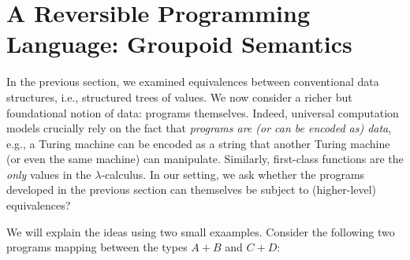 \section{A Reversible Programming Language: Groupoid Semantics}
\label{sec:reversibletwo}
\label{langeqeq}

In the previous section, we examined equivalences between conventional data structures, i.e., structured trees of
values. We now consider a richer but foundational notion of data: programs themselves. Indeed, universal computation
models crucially rely on the fact that \emph{programs are (or can be encoded as) data}, e.g., a Turing machine can be
encoded as a string that another Turing machine (or even the same machine) can manipulate. Similarly, first-class
functions are the \emph{only} values in the $\lambda$-calculus.  In our setting, we ask whether the programs developed
in the previous section can themselves be subject to (higher-level) equivalences?

We will explain the ideas using two small exaamples. Consider the following two programs mapping between the types
$A + B$ and $C+D$:

